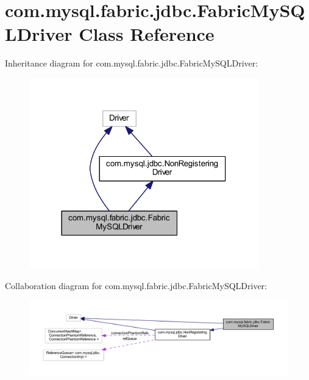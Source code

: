 \hypertarget{classcom_1_1mysql_1_1fabric_1_1jdbc_1_1_fabric_my_s_q_l_driver}{}\section{com.\+mysql.\+fabric.\+jdbc.\+Fabric\+My\+S\+Q\+L\+Driver Class Reference}
\label{classcom_1_1mysql_1_1fabric_1_1jdbc_1_1_fabric_my_s_q_l_driver}


Inheritance diagram for com.\+mysql.\+fabric.\+jdbc.\+Fabric\+My\+S\+Q\+L\+Driver\+:\nopagebreak
\begin{figure}[H]
\begin{center}
\leavevmode
\includegraphics[width=282pt]{classcom_1_1mysql_1_1fabric_1_1jdbc_1_1_fabric_my_s_q_l_driver__inherit__graph}
\end{center}
\end{figure}


Collaboration diagram for com.\+mysql.\+fabric.\+jdbc.\+Fabric\+My\+S\+Q\+L\+Driver\+:\nopagebreak
\begin{figure}[H]
\begin{center}
\leavevmode
\includegraphics[width=350pt]{classcom_1_1mysql_1_1fabric_1_1jdbc_1_1_fabric_my_s_q_l_driver__coll__graph}
\end{center}
\end{figure}
